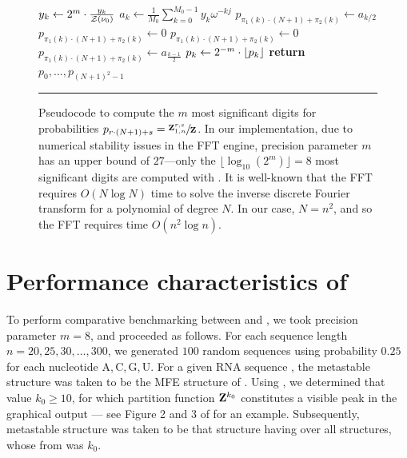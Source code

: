 \begin{figure}[!ht]
\begin{algorithmic}[1]
\State $y_k \gets 2^m \cdot \frac{y_k}{{\mathcal Z}_{}(\nu_0)}$
\EndFor
{}
\State $a_k \gets \frac{1}{M_0} \sum_{k=0}^{M_0-1} y_k \omega^{-kj}$
\EndFor
{}
\State $p_{\pi_1(k) \cdot (N+1) + \pi_2(k)} \gets a_{k/2}$
\Else
\State $p_{\pi_1(k) \cdot (N+1) + \pi_2(k)} \gets 0$
\EndIf
\Else
{}
\State $p_{\pi_1(k) \cdot (N+1) + \pi_2(k)} \gets 0$
\Else
\State $p_{\pi_1(k) \cdot (N+1) + \pi_2(k)} \gets a_{\frac{k-1}{2}}$
\EndIf
\EndIf
\EndFor
{}
\State $p_k \gets 2^{-m} \cdot \lfloor p_k \rfloor$
\EndFor
\State \textbf{return} $p_0,\dots,p_{(N + 1)^2 - 1}$
\EndFunction
\rule[-0.35ex]{0pt}{0pt}
\end{algorithmic}
\caption[Pseudocode for improved \ffttwo]{
Pseudocode to compute the $m$ most significant digits
for probabilities
$p_{r\cdot(N + 1)+s} = \sfrac{{\bf Z}^{r,s}_{1,n}}{{\bf Z}^{}_{}}$. In our implementation,
due to numerical stability issues in the FFT engine, precision parameter
$m$ has an upper bound of $27$---only the $\lfloor \log_{10}(2^m) \rfloor =8$ most significant digits
are computed with \ffttwo. It is well-known that
the FFT requires $O(N \log N)$ time to solve the inverse discrete
Fourier transform for a polynomial of degree $N$. In our case,
$N=n^2$, and so the FFT requires time $O(n^2 \log n)$.
}
\label{fig:ffttwo:algoImproved}
\rule[0ex]{0pt}{1.5em} \hrule
\end{figure}

\section{Performance characteristics of \ffttwo}
\label{sec:ffttwo:speed}

To perform comparative benchmarking between \rnatwofold and \ffttwo,
we took precision parameter $m=8$, and proceeded as follows.
For each sequence length $n = 20,25,30,\ldots,300$, we generated
$100$ random sequences using probability $0.25$ for each nucleotide
A,\,C,\,G,\,U.
For a given RNA sequence \seq, the metastable structure \strA was
taken to be the MFE structure of \seq.
Using \rnabor, we determined that value $k_0 \geq 10$, for which
partition function ${\bf Z}^{k_0}_{}$ constitutes a visible peak in the graphical
output --- see Figure 2 and 3 of \citep{freyhult.b07} for an example.
Subsequently, metastable structure \strB was taken to be that structure
having \mfe over all structures, whose \bpd from
\strA was $k_0$.

